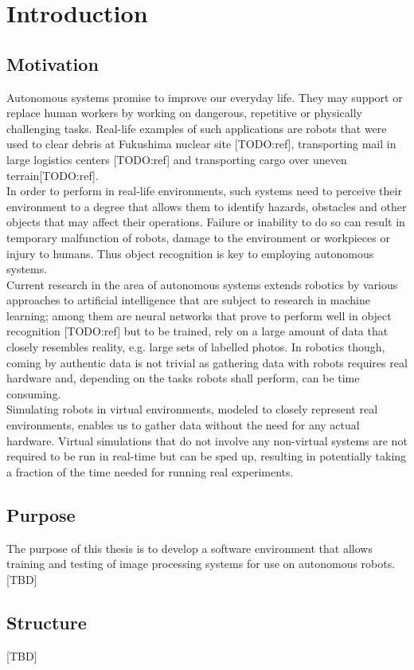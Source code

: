 \chapter{Introduction}

\section{Motivation}
Autonomous systems promise to improve our everyday life. They may support or replace human workers by working on dangerous, repetitive or physically challenging tasks. Real-life examples of such applications are robots that were used to clear debris at Fukushima nuclear site [TODO:ref], transporting mail in large logistics centers [TODO:ref] and transporting cargo over uneven terrain[TODO:ref].\\
In order to perform in real-life environments, such systems need to perceive their environment to a degree that allows them to identify hazards, obstacles and other objects that may affect their operations. Failure or inability to do so can result in temporary malfunction of robots, damage to the environment or workpieces or injury to humans. Thus object recognition is key to employing autonomous systems.\\
Current research in the area of autonomous systems extends robotics by various approaches to artificial intelligence that are subject to research in machine learning; among them are neural networks that prove to perform well in object recognition [TODO:ref] but to be trained, rely on a large amount of data that closely resembles reality, e.g. large sets of labelled photos. In robotics though, coming by authentic data is not trivial as gathering data with robots requires real hardware and, depending on the tasks robots shall perform, can be time consuming.\\
Simulating robots in virtual environments, modeled to closely represent real environments, enables us to gather data without the need for any actual hardware. Virtual simulations that do not involve any non-virtual systems are not required to be run in real-time but can be sped up, resulting in potentially taking a fraction of the time needed for running real experiments.

\section{Purpose}
The purpose of this thesis is to develop a software environment that allows training and testing of image processing systems for use on autonomous robots.\cite{Gao2017}
[TBD]

\section{Structure}
[TBD]